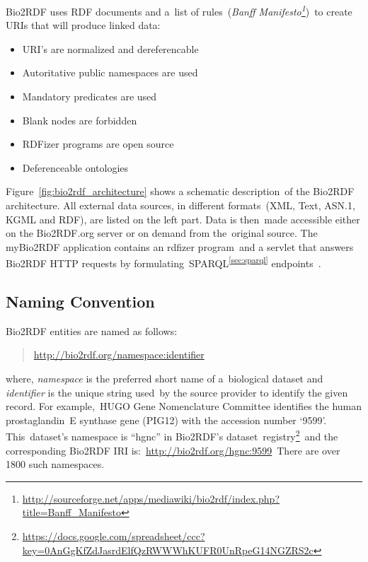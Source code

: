 \documentclass[DIV=calc, paper=a4, fontsize=12pt, onecolumn]{scrartcl}	 %
\begin{document}
  \noindent Bio2RDF uses RDF documents and a\
  list of rules\
  (\emph{Banff Manifesto\footnote{\url{http://sourceforge.net/apps/mediawiki/bio2rdf/index.php?title=Banff_Manifesto}}})\
  to create URIs that will produce linked data:
  \begin{itemize}
    \itemindent3em
    \itemsep0ex
    \item [\textbf{Rule 1:}] URI's are normalized and dereferencable
    \item [\textbf{Rule 2:}] Autoritative public namespaces are used 
    \item [\textbf{Rule 3:}] Mandatory predicates are used
    \item [\textbf{Rule 4:}] Blank nodes are forbidden
    \item [\textbf{Rule 5:}] RDFizer programs are open source
    \item [\textbf{Rule 6:}] Deferenceable ontologies
  \end{itemize}
  Figure~\ref{fig:bio2rdf_architecture} shows a schematic description\
  of the Bio2RDF architecture. All external data sources, in different formats\
  (XML, Text, ASN.1, KGML and RDF), are listed on the left part. Data is then\
  made accessible either on the Bio2RDF.org server or on demand from the\
  original source. The myBio2RDF application contains an rdfizer program\
  and a servlet that answers Bio2RDF HTTP requests by formulating\
  SPARQL\textsuperscript{\ref{sec:sparql}} endpoints~\citep{callahan_bio2rdf_2013}.\\
  
  \subsection{Naming Convention}
  Bio2RDF entities are named as follows:
  \begin{quote}
    \url{http://bio2rdf.org/namespace:identifier}
  \end{quote}
  \noindent where, \emph{namespace} is the preferred short name of a\
  biological dataset and \emph{identifier} is the unique string used\
  by the source provider to identify the given record. For example,\
  HUGO Gene Nomenclature Committee identifies the human prostaglandin\
  E synthase gene (PIG12) with the accession number `9599'. This\
  dataset's namespace is ``hgnc'' in Bio2RDF's dataset\
  registry\footnote{\url{https://docs.google.com/spreadsheet/ccc?key=0AnGgKfZdJasrdElfQzRWWWhKUFR0UnRpeG14NGZRS2c}}\
  and the corresponding Bio2RDF IRI is:~\url{http://bio2rdf.org/hgnc:9599}\
  There are over 1800 such namespaces.
  
\end{document}
